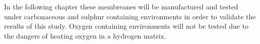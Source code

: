 In the following chapter these membreanes will be manufactured and tested under carbonaceous and sulphur containing environments in order to validate the results of this study. Oxygen containing environments will not be tested due to the dangers of heating oxygen in a hydrogen matrix.



